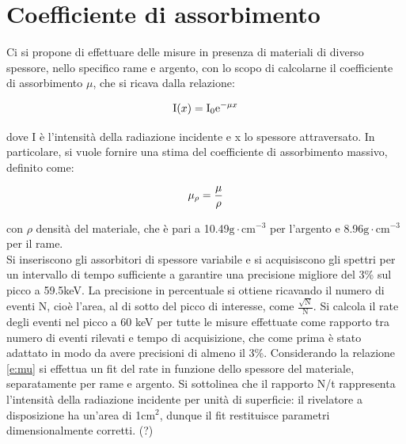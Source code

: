 \documentclass[twocolumn,10pt]{asme2ej}
\begin{document}
\section{Coefficiente di assorbimento}\label{s:attenuazione} 

Ci si propone di effettuare delle misure in presenza di materiali di diverso spessore, nello specifico rame e argento,
con lo scopo di calcolarne il coefficiente di assorbimento $\mu$, che si ricava dalla relazione:

\vspace{-15pt}
\begin{equation}
   \text{I}(x) = \text{I}_0 \text{e}^{-\mu x}
    \vspace{-5pt}
    \label{e:mu}
\end{equation}

dove I è l'intensità della radiazione incidente e x lo spessore attraversato. In particolare, si vuole fornire una stima
del coefficiente di assorbimento massivo, definito come:

\vspace{-15pt}
\begin{equation}
   \mu_{\rho} = \frac{\mu}{\rho}
    \vspace{-5pt}
    \label{e:mu_mass}
\end{equation}

con $\rho$ densità del materiale, che è pari a 10.49$\si{\gram \cdot \centi\metre ^{-3}}$ per l'argento
e 8.96$\si{\gram \cdot \centi\metre ^{-3}}$ per il rame. 
\\ Si inseriscono gli assorbitori di spessore variabile e si acquisiscono gli spettri per
un intervallo di tempo sufficiente a garantire una precisione migliore del 3\% sul picco a 59.5keV.
La precisione in percentuale si ottiene ricavando il numero di eventi N, cioè l'area, al di sotto del
picco di interesse, come $\frac{\sqrt{\text{N}}}{\text{N}}$. 
Si calcola il rate degli eventi nel picco a 60 keV per tutte le misure effettuate come rapporto tra numero di 
eventi rilevati e tempo di acquisizione, che come prima è stato adattato in modo da avere precisioni di almeno il 3\%.
Considerando la relazione \autoref{e:mu} si effettua un fit del rate in funzione dello spessore del materiale, 
separatamente per rame e argento. Si sottolinea che il rapporto N/t rappresenta l'intensità della radiazione incidente
per unità di superficie: il rivelatore a disposizione ha un'area di 1$\si{\centi\metre}^2$, dunque il fit restituisce 
parametri dimensionalmente corretti. (?) \\
\end{document}
